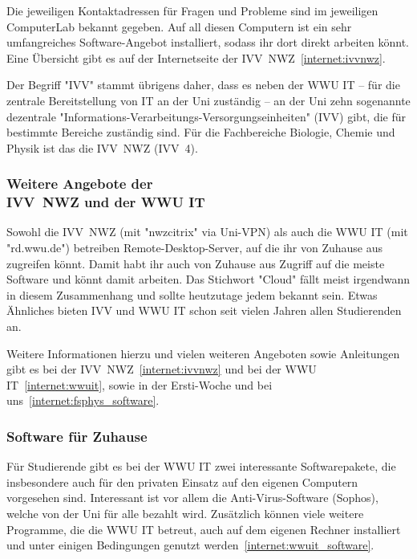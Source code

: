 \begin{multicols}{2}
Die jeweiligen Kontaktadressen für Fragen und Probleme sind im jeweiligen ComputerLab bekannt gegeben.
Auf all diesen Computern ist ein sehr umfangreiches Software-Angebot installiert, sodass ihr dort direkt arbeiten könnt.
Eine Übersicht gibt es auf der Internetseite der IVV~NWZ~\cref{internet:ivvnwz}.

Der Begriff "IVV" stammt übrigens daher, dass es neben der WWU IT -- für die zentrale Bereitstellung von IT an der Uni zuständig -- an der Uni zehn sogenannte dezentrale "Informations-Verarbeitungs-Versorgungseinheiten" (IVV) gibt, die für bestimmte Bereiche zuständig sind.
Für die Fachbereiche Biologie, Chemie und Physik ist das die IVV~NWZ (IVV~4).

\subsubsection[Weitere Angebote der IVV~NWZ und der WWU IT]{Weitere Angebote der\\IVV~NWZ und der WWU IT}
Sowohl die IVV~NWZ (mit "nwzcitrix" via Uni-VPN) als auch die WWU IT (mit "rd.wwu.de") betreiben Remote-Desktop-Server, auf die ihr von Zuhause aus zugreifen könnt.
Damit habt ihr auch von Zuhause aus Zugriff auf die meiste Software und könnt damit arbeiten.
Das Stichwort "Cloud" fällt meist irgendwann in diesem Zusammenhang und sollte heutzutage jedem bekannt sein.
Etwas Ähnliches bieten IVV und WWU IT schon seit vielen Jahren allen Studierenden an.

Weitere Informationen hierzu und vielen weiteren Angeboten sowie Anleitungen gibt es bei der IVV~NWZ~\cref{internet:ivvnwz} und bei der WWU IT~\cref{internet:wwuit}, sowie in der Ersti-Woche und bei uns~\cref{internet:fsphys_software}.

\subsubsection{Software für Zuhause}
Für Studierende gibt es bei der WWU IT zwei interessante Softwarepakete, die insbesondere auch für den privaten Einsatz auf den eigenen Computern vorgesehen sind.
Interessant ist vor allem die Anti-Virus-Software (Sophos), welche von der Uni für alle bezahlt wird.
Zusätzlich können viele weitere Programme, die die WWU IT betreut, auch auf dem eigenen Rechner installiert und unter einigen Bedingungen genutzt werden~\cref{internet:wwuit_software}.


\end{multicols}
